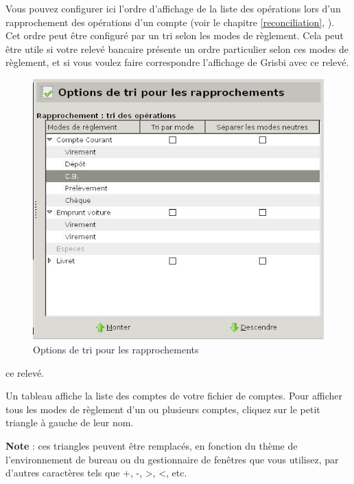 Vous pouvez configurer ici l'ordre d'affichage de la liste des opérations lors d'un rapprochement des opérations d'un compte (voir le chapitre \vref{reconciliation}, ). Cet ordre peut être configuré par un \gls{tri} selon les modes de règlement. Cela peut être utile si votre relevé bancaire présente un ordre particulier selon ces modes de règlement, et si vous voulez faire correspondre l'affichage de Grisbi avec \ifIllustration ce relevé.
\begin{figure}[htbp]
\begin{center}
\includegraphics[scale=0.5]{image/screenshot/setup_reconciliation_sort}
\end{center}
\caption{Options de tri pour les rapprochements}
\label{setup-reconciliation-sort-img}
\end{figure}
\else ce relevé.
\fi

Un tableau affiche la liste des comptes de votre fichier de comptes. Pour afficher tous les modes de règlement d'un ou plusieurs comptes, cliquez sur le petit triangle à gauche de leur nom.

\textbf{Note} : ces triangles peuvent être remplacés, en fonction du thème de l'environnement de bureau ou du gestionnaire de fenêtres que vous utilisez, par d'autres caractères tels que +, -, >, <, etc.


